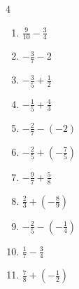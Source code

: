 \begin{multicols}{4}
\begin{enumerate}

  \item $\displaystyle \frac{9}{10} - \frac{3}{4}$


  \item $\displaystyle -\frac{3}{7} - 2$


  \item $\displaystyle -\frac{3}{5} + \frac{1}{2}$


  \item $\displaystyle -\frac{1}{5} + \frac{4}{3}$


  \item $\displaystyle -\frac{2}{7} - \left(-2\right)$


\columnbreak %

\resetques

  \item $\displaystyle -\frac{2}{5} + \left(-\frac{7}{5}\right)$


  \item $\displaystyle -\frac{9}{7} + \frac{5}{8}$


  \item $\displaystyle \frac{2}{3} + \left(-\frac{8}{9}\right)$


  \item $\displaystyle -\frac{2}{5} - \left(-\frac{1}{4}\right)$


  \item $\displaystyle \frac{1}{7} - \frac{3}{4}$


  \item $\displaystyle \frac{7}{8} + \left(-\frac{1}{2}\right)$


\end{enumerate}
\end{multicols}
